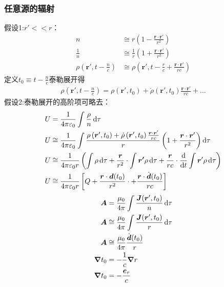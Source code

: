 \subsubsection{任意源的辐射}
假设1:$r'<<r$：
\begin{align*}
    n&\cong r\left(1-\frac{\boldsymbol{r}\cdot\boldsymbol{r}'}{r^2}\right)\\
    \frac{1}{n}&\cong \frac{1}{r}\left(1+\frac{\boldsymbol{r}\cdot\boldsymbol{r}'}{r^2}\right)\\
    \rho\left(\boldsymbol{r}',t-\frac{n}{c}\right)&\cong\rho\left(\boldsymbol{r}',t-\frac{r}{c}+\frac{\boldsymbol{r}\cdot\boldsymbol{r}'}{rc }\right)
\end{align*}
定义$t_0\equiv t-\frac{n}{c}$泰勒展开得
\begin{align*}
    \rho\left(\boldsymbol{r}',t-\frac{n}{c}\right)=\rho\left(\boldsymbol{r}',t_0\right)
    +\dot\rho\left(\boldsymbol{r}',t_0\right)\frac{\boldsymbol{r}\cdot\boldsymbol{r}'}{rc }+...
\end{align*}
假设2:泰勒展开的高阶项可略去：
\begin{align*}
    U&=\frac{1}{4\pi\varepsilon_0}\int\frac{\rho}{n}\dif\tau\\
    U&\cong\frac{1}{4\pi\varepsilon_0}\int\frac{\rho\left(\boldsymbol{r}',t_0\right)
    +\dot\rho\left(\boldsymbol{r}',t_0\right)\frac{\boldsymbol{r}\cdot\boldsymbol{r}'}{rc }}{r}\left(1+\frac{\boldsymbol{r}\cdot\boldsymbol{r}'}{r^2}\right)\dif\tau\\
    U&\cong\frac{1}{4\pi\varepsilon_0r}\left(\int \rho\dif\tau
    +\frac{\boldsymbol{r}}{r^2}\cdot\int\boldsymbol{r'} \rho\dif\tau
    +\frac{\boldsymbol{r}}{r c}\cdot\frac{\dif}{\dif t}\int \boldsymbol{r}'\rho\dif\tau\right)\\
    U&\cong\frac{1}{4\pi\varepsilon_0r}\left[Q
    +\frac{\boldsymbol{r}\cdot\boldsymbol{d}(t_0)}{r^2}\cdot
    +\frac{\boldsymbol{r}\cdot\dot{\boldsymbol{d}}(t_0)}{r c}\right]
\end{align*}
\begin{align*}
    \boldsymbol{A}&=\frac{\mu_0}{4\pi}\int\frac{\boldsymbol{J}(\boldsymbol{r}',t_0)}{n}\dif\tau\\
    \boldsymbol{A}&\cong\frac{\mu_0}{4\pi}\int\frac{\boldsymbol{J}(\boldsymbol{r}',t_0)}{r}\dif\tau\\
    \boldsymbol{A}&\cong\frac{\mu_0}{4\pi}\frac{\dot{\boldsymbol{d}}(t_0)}{r}\\
    \boldsymbol{\nabla}t_0&=-\frac{1}{c}\boldsymbol{\nabla}r\\
    \boldsymbol{\nabla}t_0&=-\frac{\boldsymbol{e}_r}{c}
\end{align*}
